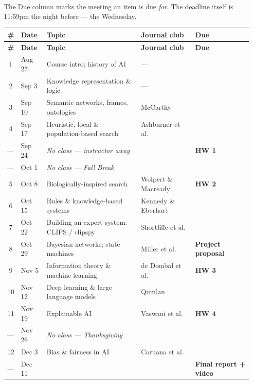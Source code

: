 \documentclass[11pt]{article}
\begin{document}
The Due column marks the meeting an item is due \emph{for}. The deadline itself is 11:59pm the
night before --- the Wednesday.

\begin{longtable}{@{}cl>{\raggedright\arraybackslash}p{5.1cm}>{\raggedright\arraybackslash}p{3.3cm}l@{}}
  \toprule
  \textbf{\#} & \textbf{Date} & \textbf{Topic} & \textbf{Journal club} & \textbf{Due} \\
  \midrule
  \endfirsthead
  \toprule
  \textbf{\#} & \textbf{Date} & \textbf{Topic} & \textbf{Journal club} & \textbf{Due} \\
  \midrule
  \endhead
  1 & Aug 27 & Course intro; history of AI & --- & \\
  2 & Sep 3 & Knowledge representation \& logic & --- & \\
  3 & Sep 10 & Semantic networks, frames, ontologies & McCarthy & \\
  4 & Sep 17 & Heuristic, local \& population-based search & Ashburner et al. & \\
  --- & Sep 24 & \emph{No class --- instructor away} & & \textbf{HW 1} \\
  --- & Oct 1 & \emph{No class --- Fall Break} & & \\
  5 & Oct 8 & Biologically-inspired search & Wolpert \& Macready & \textbf{HW 2} \\
  6 & Oct 15 & Rules \& knowledge-based systems & Kennedy \& Eberhart & \\
  7 & Oct 22 & Building an expert system: CLIPS / clipspy & Shortliffe et al. & \\
  8 & Oct 29 & Bayesian networks; state machines & Miller et al. & \textbf{Project proposal} \\
  9 & Nov 5 & Information theory \& machine learning & de Dombal et al. & \textbf{HW 3} \\
  10 & Nov 12 & Deep learning \& large language models & Quinlan & \\
  11 & Nov 19 & Explainable AI & Vaswani et al. & \textbf{HW 4} \\
  --- & Nov 26 & \emph{No class --- Thanksgiving} & & \\
  12 & Dec 3 & Bias \& fairness in AI & Caruana et al. & \\
  --- & Dec 11 & & & \textbf{Final report + video} \\
  \bottomrule
\end{longtable}
\end{document}
